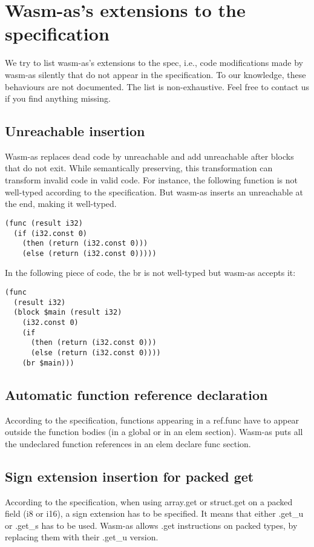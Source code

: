 \documentclass[a4paper,11pt]{article}
\begin{document}
\newpage
\appendix
\section{Wasm-as's extensions to the specification}\label{wasmasex}
We try to list wasm-as's extensions to the spec, i.e., code modifications made by
wasm-as silently that do not appear in the specification. To our knowledge, these
behaviours are not documented. The list is non-exhaustive. Feel free to contact
us if you find anything missing.
\subsection{\textsf{Unreachable} insertion}
Wasm-as replaces dead code by \textsf{unreachable} and add
\textsf{unreachable} after blocks that do not exit. While semantically
preserving, this transformation can transform invalid code in valid code. For
instance, the following function is not well-typed according to the specification. But
wasm-as inserts an \textsf{unreachable} at the end, making it well-typed.
\begin{lstlisting}
(func (result i32)
  (if (i32.const 0)
    (then (return (i32.const 0)))
    (else (return (i32.const 0)))))
\end{lstlisting}

In the following piece of code, the \textsf{br} is not well-typed but wasm-as accepts
it:
\begin{lstlisting}
(func
  (result i32)
  (block $main (result i32)
    (i32.const 0)
    (if
      (then (return (i32.const 0)))
      (else (return (i32.const 0))))
    (br $main)))
\end{lstlisting}
\subsection{Automatic function reference declaration}
According to the specification, functions appearing in a \textsf{ref.func} have to
appear outside the function bodies (in a global or in an elem section). Wasm-as
puts all the undeclared function references in an \textsf{elem declare func} section.

\subsection{Sign extension insertion for packed get}
According to the specification, when using \textsf{array.get} or
\textsf{struct.get} on a packed field (\textsf{i8} or \textsf{i16}), a sign
extension has to be specified. It means that either \textsf{.get\_u} or
\textsf{.get\_s} has to be used. Wasm-as allows \textsf{.get} instructions on
packed types, by replacing them with their \textsf{.get\_u} version.
\end{document}
